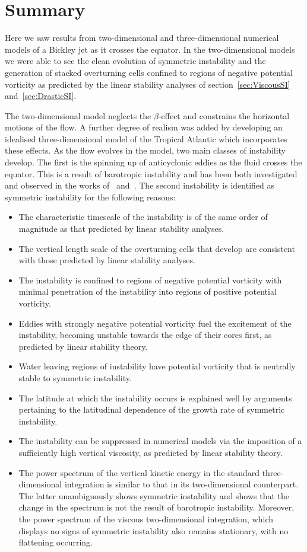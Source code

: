 \section{Summary}
Here we saw results from two-dimensional and three-dimensional numerical models of a Bickley jet as it crosses the equator. In the two-dimensional models we were able to see the clean evolution of symmetric instability and the generation of stacked overturning cells confined to regions of negative potential vorticity as predicted by the linear stability analyses of section~\ref{sec:ViscousSI} and~\ref{sec:DrasticSI}.

The two-dimensional model neglects the $\beta$-effect and constrains the horizontal motions of the flow. A further degree of realism was added by developing an idealised three-dimensional model of the Tropical Atlantic which incorporates these effects. As the flow evolves in the model, two main classes of instability develop. The first is the spinning up of anticyclonic eddies as the fluid crosses the equator. This is a result of barotropic instability and has been both investigated and observed in the works of~\citet{Edwards1998I, Edwards1998II} and~\citet{Goes2009}. The second instability is identified as symmetric instability for the following reasons:
\begin{itemize}
    \item The characteristic timescale of the instability is of the same order of magnitude as that predicted by linear stability analyses.
    \item The vertical length scale of the overturning cells that develop are consistent with those predicted by linear stability analyses.
    \item The instability is confined to regions of negative potential vorticity with minimal penetration of the instability into regions of positive potential vorticity.
    \item Eddies with strongly negative potential vorticity fuel the excitement of the instability, becoming unstable towards the edge of their cores first, as predicted by linear stability theory.
    \item Water leaving regions of instability have potential vorticity that is neutrally stable to symmetric instability.
    \item The latitude at which the instability occurs is explained well by arguments pertaining to the latitudinal dependence of the growth rate of symmetric instability.
    \item The instability can be suppressed in numerical models via the imposition of a sufficiently high vertical viscosity, as predicted by linear stability theory.
    \item The power spectrum of the vertical kinetic energy in the standard three-dimensional integration is similar to that in its two-dimensional counterpart. The latter unambiguously shows symmetric instability and shows that the change in the spectrum is not the result of barotropic instability. Moreover, the power spectrum of the viscous two-dimensional integration, which displays no signs of symmetric instability also remains stationary, with no flattening occurring.
\end{itemize}

